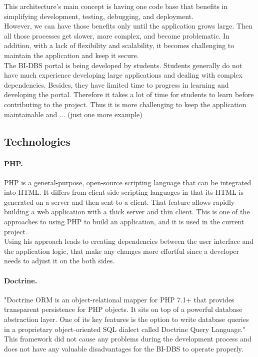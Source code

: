\noindent This architecture's main concept is having one code base that benefits in \\ simplifying development, testing, debugging, and deployment. \\
However, we can have those benefits only until the application grows large. Then all those processes get slower, more complex, and become problematic. In addition, with a lack of flexibility and scalability, it becomes challenging to maintain the application and keep it secure. \\

\noindent The BI-DBS portal is being developed by students. Students generally do not have much experience developing large applications and dealing with complex dependencies. Besides, they have limited time to progress in learning and developing the portal. Therefore it takes a lot of time for students to learn before contributing to the project. Thus it is more challenging to keep the application maintainable and ... (just one more example)




\subsection{Technologies}
\paragraph*{PHP.} PHP is a general-purpose, open-source scripting language that can be integrated into HTML. It differs from client-side scripting languages in that its HTML is generated on a server and then sent to a client. That feature allows rapidly building a web application with a thick server and thin client. This is one of the approaches to using PHP to build an application, and it is used in the current project. \\
Using his approach leads to creating dependencies between the user interface and the application logic, that make any changes more effortful since a developer needs to adjust it on the both sides.

\paragraph*{Doctrine.} "Doctrine ORM is an object-relational mapper for PHP 7.1+ that provides transparent persistence for PHP objects. It sits on top of a powerful database abstraction layer. One of its key features is the option to write database queries in a proprietary object-oriented SQL dialect called Doctrine Query Language."\\ 
This framework did not cause any problems during the development process and does not have any valuable disadvantages for the BI-DBS to operate properly.

